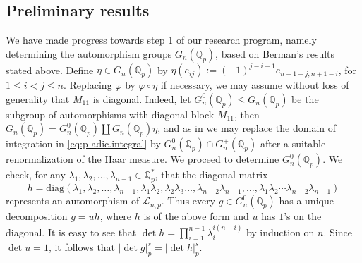 \documentclass[12pt]{article}
\begin{document}
\subsection{Preliminary results}
\label{preliminary.results}
We have made progress towards step 1 of our research program, namely determining the automorphism groups $G_{n}(\mathbb{Q}_p)$, based on Berman's results stated above.
Define $\eta\in{G_{n}(\mathbb{Q}_p)}$ by $\eta(e_{ij}):=(-1)^{j-i-1}e_{n+1-j,n+1-i}$, for $1\leq{i}<{j}\leq{n}$. Replacing $\varphi$ by $\varphi\circ\eta$ if necessary, we may assume without loss of generality that $M_{11}$ is diagonal. Indeed, let $G_{n}^{0}(\mathbb{Q}_{p})\leq{G_{n}(\mathbb{Q}_{p})}$ be the subgroup of automorphisms with diagonal block $M_{11}$, then $G_{n}(\mathbb{Q}_{p})=G_{n}^{0}(\mathbb{Q}_{p})\coprod{G_{n}(\mathbb{Q}_{p})}\eta$, and as in \cite{DuSautoyLubotzky} we may replace the domain of integration in \eqref{eq:p-adic.integral} by $G_{n}^{0}(\mathbb{Q}_{p})\cap{G_{n}^{+}(\mathbb{Q}_{p})}$ after a suitable renormalization of the Haar measure. We proceed to determine $G_{n}^{0}(\mathbb{Q}_{p})$.
We check, for any $\lambda_{1},\lambda_{2},\dots,\lambda_{n-1}\in\mathbb{Q}_{p}^{\ast}$, that the diagonal matrix \[h=\mathrm{diag}(\lambda_{1},\lambda_{2},\dots,\lambda_{n-1},\lambda_{1}\lambda_{2},\lambda_{2}\lambda_{3}\dots,\lambda_{n-2}\lambda_{n-1},\dots,\lambda_{1}\lambda_{2}\cdots\lambda_{n-2}\lambda_{n-1})\]
represents an automorphism of $\mathcal{L}_{n,p}$. Thus every $g\in{G_{n}^{0}(\mathbb{Q}_{p})}$ has a unique decomposition $g=uh$, where $h$ is of the above form and $u$ has $1$'s on the diagonal. It is easy to see that $\det{h}=\prod_{i=1}^{n-1}\lambda_i^{i(n-i)}$ by induction on $n$. Since $\det{u}=1$, it follows that $|\det{g}|_{p}^{s}=|\det{h}|_{p}^{s}$.
\end{document}
